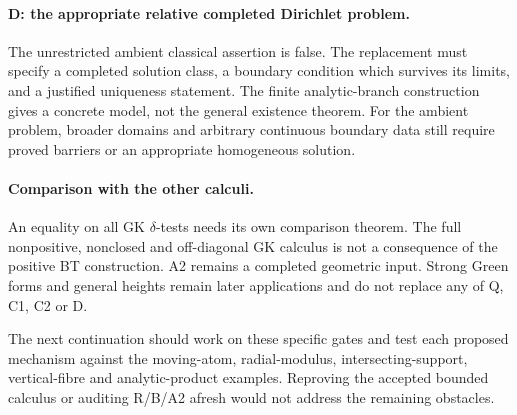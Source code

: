 \documentclass[11pt,a4paper]{article}
\numberwithin{equation}{section}
\theoremstyle{definition}
\theoremstyle{remark}
\begin{document}
\paragraph{D: the appropriate relative completed Dirichlet problem.}
The unrestricted ambient classical assertion is false. The replacement
must specify a completed solution class, a boundary condition which
survives its limits, and a justified uniqueness statement. The finite
analytic-branch construction gives a concrete model, not the general
existence theorem. For the ambient problem, broader domains and
arbitrary continuous boundary data still require proved barriers or
an appropriate homogeneous solution.

\paragraph{Comparison with the other calculi.}
An equality on all GK $\delta$-tests needs its own comparison theorem.
The full nonpositive, nonclosed and off-diagonal GK calculus is not a
consequence of the positive BT construction. A2 remains a completed
geometric input. Strong Green forms and general heights remain later
applications and do not replace any of Q, C1, C2 or D.

The next continuation should work on these specific gates and test
each proposed mechanism against the moving-atom, radial-modulus,
intersecting-support, vertical-fibre and analytic-product examples.
Reproving the accepted bounded calculus or auditing R/B/A2 afresh
would not address the remaining obstacles.


\clearpage
\end{document}
